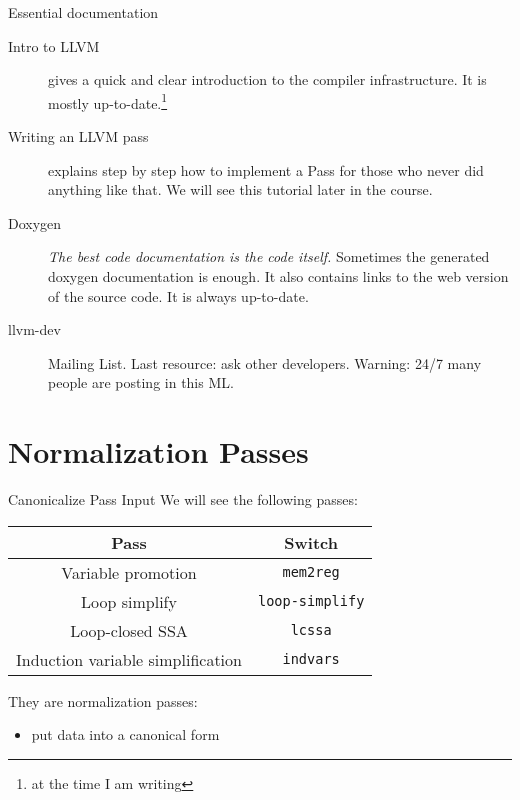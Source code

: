 \documentclass[10pt,mathserif]{beamer}
\begin{document}
\begin{frame}[t]{Essential documentation}
  \begin{description}
    \item[Intro to LLVM] \cite{LOCAL:www/llvmIntro}
          gives a quick and clear introduction to the compiler infrastructure.
          It is mostly up-to-date.\footnote{at the time I am writing}
    \vfill
    \item[Writing an LLVM pass] \cite{LOCAL:www/llvmWritingAPass}
          explains step by step how to implement a Pass
          for those who never did anything like that.
          We will see this tutorial later in the course.
    \vfill
    \item[Doxygen] \cite{LOCAL:www/llvmDoxygen}
          \textit{The best code documentation is the code itself.}
          Sometimes the generated doxygen documentation is enough.
          It also contains links to the web version of the source code.
          It is always up-to-date.
    \vfill
    \item[llvm-dev] Mailing List. Last resource: ask other developers.
          Warning: 24/7 many people are posting in this ML.
  \end{description}
\end{frame}

\section{Normalization Passes}
\begin{frame}{Canonicalize Pass Input}
We will see the following passes:

\begin{table}
\centering
\begin{tabular}{cc}
\toprule

\multicolumn{1}{c}{\textbf{Pass}}    &
\multicolumn{1}{c}{\textbf{Switch}} \\

\midrule

Variable promotion  &
\texttt{mem2reg}   \\

Loop simplify           &
\texttt{loop-simplify} \\

Loop-closed SSA  &
\texttt{lcssa}  \\

Induction variable simplification  &
\texttt{indvars}                  \\

\bottomrule
\end{tabular}
\end{table}

They are \alert{normalization} passes:

\begin{itemize}
\item put data into a canonical form
\end{itemize}
\end{frame}
\end{document}
